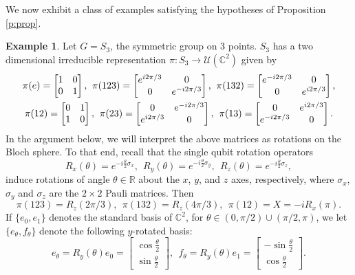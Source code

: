 \documentclass[11pt]{amsart}
\theoremstyle{definition}
\newtheorem{example}[theorem]{Example}
\newcommand{\cl}[1]{\mathcal{#1}}
\newcommand{\hs}{\hskip2pt}
\begin{document}
We now exhibit a class of examples satisfying the hypotheses of Proposition \ref{p:prop}.

\begin{example}\label{ex:S_3} Let $G=S_3$, the symmetric group on 3 points. $S_3$ has a two dimensional irreducible representation $\pi:S_3\rightarrow \cl{U}(\mathbb{C}^2)$ given by
\begin{gather*}
    \pi(e)=\begin{bmatrix} 1 & 0\\ 0 & 1 \end{bmatrix},\hs\hs
    \pi(123)=\begin{bmatrix} e^{i2\pi/3} & 0\\ 0 & e^{-i2\pi/3} \end{bmatrix},\hs\hs
    \pi(132)=\begin{bmatrix} e^{-i2\pi/3} & 0\\ 0 & e^{i2\pi/3} \end{bmatrix},\\
    \pi(12)=\begin{bmatrix} 0 & 1\\ 1 & 0 \end{bmatrix},\hs\hs
    \pi(23)=\begin{bmatrix} 0 & e^{-i2\pi/3}\\ e^{i2\pi/3} & 0 \end{bmatrix},\hs\hs
    \pi(13)=\begin{bmatrix} 0 & e^{i2\pi/3}\\ e^{-i2\pi/3} & 0 \end{bmatrix}.
\end{gather*}
In the argument below, we will interpret the above matrices as rotations on the Bloch sphere. To that end, recall that the single qubit rotation operators
$$R_{x}(\theta)=e^{-i\frac{\theta}{2}\sigma_x}, \ \ R_{y}(\theta)=e^{-i\frac{\theta}{2}\sigma_y}, \ \ R_{z}(\theta)=e^{-i\frac{\theta}{2}\sigma_z},$$
induce rotations of angle $\theta\in\mathbb{R}$ about the $x$, $y$, and $z$ axes, respectively, where $\sigma_x$, 
$\sigma_y$ and $\sigma_z$ are the $2\times 2$ Pauli matrices.
Then
$$\pi(123)=R_z(2\pi/3), \ \ \pi(132)=R_z(4\pi/3), \ \ \pi(12)=X=-iR_x(\pi).$$
If $\{e_0,e_1\}$ denotes the standard basis of $\mathbb{C}^2$, for $\theta\in(0,\pi/2)\cup(\pi/2,\pi)$, we let 
$\{e_\theta,f_\theta\}$ denote the following $y$-rotated basis:
$$e_{\theta}=R_y(\theta)e_0=\begin{bmatrix}\cos\frac{\theta}{2}\\\sin\frac{\theta}{2}\end{bmatrix}, \ \ f_{\theta}=R_y(\theta)e_1=\begin{bmatrix}-\sin\frac{\theta}{2}\\\cos\frac{\theta}{2}\end{bmatrix}.$$

\end{example}
\end{document}
